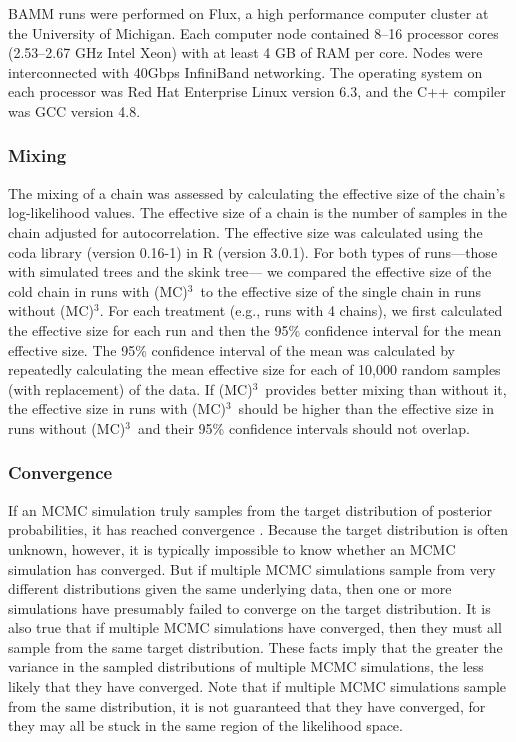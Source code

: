\documentclass[12pt]{article}
\newcommand{\MCMCMC}{(MC)$^{3}$}
\begin{document}
BAMM runs were performed on Flux,
a high performance computer cluster at the University of Michigan.
%
Each computer node contained 8--16 processor cores
(2.53--2.67 GHz Intel Xeon) with at least 4 GB of RAM per core.
%
Nodes were interconnected with 40Gbps InfiniBand networking.
%
The operating system on each processor
was Red Hat Enterprise Linux version 6.3,
and the C++ compiler was GCC version 4.8.


\subsubsection*{Mixing}

The mixing of a chain was assessed by calculating
the effective size of the chain's log-likelihood values.
%
The effective size of a chain is the number of samples
in the chain adjusted for autocorrelation.
%
The effective size was calculated using
the coda library (version 0.16-1) in R (version 3.0.1).
%
For both types of runs---those with simulated trees and the skink tree---%
we compared the effective size of the cold chain in runs with \MCMCMC\ 
to the effective size of the single chain in runs without \MCMCMC.
%
For each treatment (e.g., runs with 4 chains),
we first calculated the effective size for each run
and then the 95\% confidence interval for the mean effective size.
%
The 95\% confidence interval of the mean was calculated
by repeatedly calculating the mean effective size
for each of 10,000 random samples (with replacement) of the data.
%
If \MCMCMC\ provides better mixing than without it,
the effective size in runs with \MCMCMC\ should be higher
than the effective size in runs without \MCMCMC\ 
and their 95\% confidence intervals should not overlap.


\subsubsection*{Convergence}

If an MCMC simulation truly samples from the target distribution
of posterior probabilities, it has reached convergence \citep{giv05}.
%
Because the target distribution is often unknown, however,
it is typically impossible to know whether an MCMC simulation has converged.
%
But if multiple MCMC simulations sample from very different distributions 
given the same underlying data,
then one or more simulations have presumably 
failed to converge on the target distribution.
%
It is also true that if multiple MCMC simulations have converged,
then they must all sample from the same target distribution.
%
These facts imply that the greater the variance in the sampled distributions
of multiple MCMC simulations, the less likely that they have converged.
%
Note that if multiple MCMC simulations sample from the same distribution,
it is not guaranteed that they have converged,
for they may all be stuck in the same region of the likelihood space.
\end{document}
